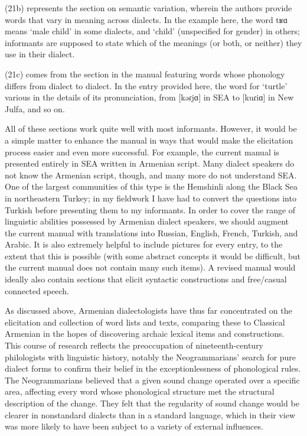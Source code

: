 \begin{exe}
(21b) represents the section on semantic variation, wherein the authors provide words that vary in meaning across dialects. In the example here, the word tʁɑ means ‘male child’ in some dialects, and ‘child’ (unspecified for gender) in others; informants are supposed to state which of the meanings (or both, or neither) they use in their dialect.

(21c) comes from the section in the manual featuring words whose phonology differs from dialect to dialect. In the entry provided here, the word for ‘turtle’ various in the details of its pronunciation, from [kǝɾjɑ] in SEA to [kuɾiɑ] in New Julfa, and so on.

All of these sections work quite well with most informants. However, it would be a simple matter to enhance the manual in ways that would make the elicitation process easier and even more successful. For example, the current manual is presented entirely in SEA written in Armenian script. Many dialect speakers do not know the Armenian script, though, and many more do not understand SEA. One of the largest communities of this type is the Hemshinli along the Black Sea in northeastern Turkey; in my fieldwork I have had to convert the questions into Turkish before presenting them to my informants. In order to cover the range of linguistic abilities possessed by Armenian dialect speakers, we should augment the current manual with translations into Russian, English, French, Turkish, and Arabic. It is also extremely helpful to include pictures for every entry, to the extent that this is possible (with some abstract concepts it would be difficult, but the current manual does not contain many such items). A revised manual would ideally also contain sections that elicit syntactic constructions and free/casual connected speech.

As discussed above, Armenian dialectologists have thus far concentrated on the elicitation and collection of word lists and texts, comparing these to Classical Armenian in the hopes of discovering archaic lexical items and constructions. This course of research reflects the preoccupation of nineteenth-century philologists with linguistic history, notably the Neogrammarians’ search for pure dialect forms to confirm their belief in the exceptionlessness of phonological rules. The Neogrammarians believed that a given sound change operated over a specific area, affecting every word whose phonological structure met the structural description of the change. They felt that the regularity of sound change would be clearer in nonstandard dialects than in a standard language, which in their view was more likely to have been subject to a variety of external influences. 


\end{exe}
